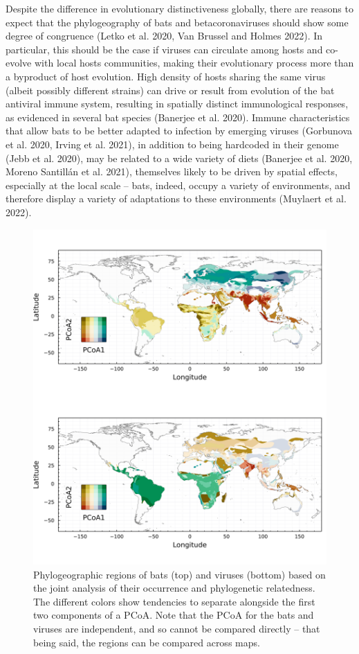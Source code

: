 \documentclass[11pt]{article}
\makeatletter
\def\maxwidth{\ifdim\Gin@nat@width>\linewidth\linewidth
\else\Gin@nat@width\fi}
\let\Oldincludegraphics\includegraphics
\renewcommand{\includegraphics}[1]{\Oldincludegraphics[width=\maxwidth]{#1}}
\makeatother
\begin{document}
Despite the difference in evolutionary distinctiveness globally, there
are reasons to expect that the phylogeography of bats and
betacoronaviruses should show some degree of congruence (Letko et al.
2020, Van Brussel and Holmes 2022). In particular, this should be the
case if viruses can circulate among hosts and co-evolve with local hosts
communities, making their evolutionary process more than a byproduct of
host evolution. High density of hosts sharing the same virus (albeit
possibly different strains) can drive or result from evolution of the
bat antiviral immune system, resulting in spatially distinct
immunological responses, as evidenced in several bat species (Banerjee
et al. 2020). Immune characteristics that allow bats to be better
adapted to infection by emerging viruses (Gorbunova et al. 2020, Irving
et al. 2021), in addition to being hardcoded in their genome (Jebb et
al. 2020), may be related to a wide variety of diets (Banerjee et al.
2020, Moreno Santillán et al. 2021), themselves likely to be driven by
spatial effects, especially at the local scale -- bats, indeed, occupy a
variety of environments, and therefore display a variety of adaptations
to these environments (Muylaert et al. 2022).

\begin{figure}
\hypertarget{fig:biogeo}{%
\centering
\includegraphics{figures/combined_biogeo.png}
\caption{Phylogeographic regions of bats (top) and viruses (bottom)
based on the joint analysis of their occurrence and phylogenetic
relatedness. The different colors show tendencies to separate alongside
the first two components of a PCoA. Note that the PCoA for the bats and
viruses are independent, and so cannot be compared directly -- that
being said, the regions can be compared across maps.}\label{fig:biogeo}
}
\end{figure}
\end{document}
